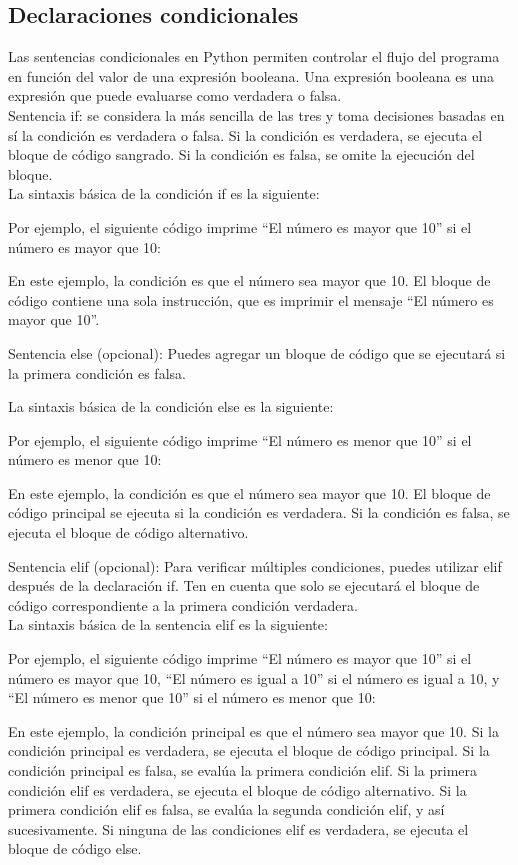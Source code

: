 \subsection{Declaraciones condicionales}
Las sentencias condicionales en Python permiten controlar el flujo del programa en función del valor de una expresión booleana. Una expresión booleana es una expresión que puede evaluarse como verdadera o falsa.\\

Sentencia if: se considera la más sencilla de las tres y toma decisiones basadas en sí la condición es verdadera o falsa. Si la condición es verdadera, se ejecuta el bloque de código sangrado. Si la condición es falsa, se omite la ejecución del bloque.\\

La sintaxis básica de la condición if es la siguiente:

Por ejemplo, el siguiente código imprime ``El número es mayor que 10'' si el número es mayor que 10:

En este ejemplo, la condición es que el número sea mayor que 10. El bloque de código contiene una sola instrucción, que es imprimir el mensaje ``El número es mayor que 10''.

Sentencia else (opcional): Puedes agregar un bloque de código que se ejecutará si la primera condición es falsa.

La sintaxis básica de la condición else es la siguiente:

Por ejemplo, el siguiente código imprime ``El número es menor que 10'' si el número es menor que 10:

En este ejemplo, la condición es que el número sea mayor que 10. El bloque de código principal se ejecuta si la condición es verdadera. Si la condición es falsa, se ejecuta el bloque de código alternativo.

Sentencia elif (opcional): Para verificar múltiples condiciones, puedes utilizar elif después de la declaración if. Ten en cuenta que solo se ejecutará el bloque de código correspondiente a la primera condición verdadera.\\

La sintaxis básica de la sentencia elif es la siguiente:


Por ejemplo, el siguiente código imprime ``El número es mayor que 10'' si el número es mayor que 10, ``El número es igual a 10'' si el número es igual a 10, y ``El número es menor que 10'' si el número es menor que 10:

En este ejemplo, la condición principal es que el número sea mayor que 10. Si la condición principal es verdadera, se ejecuta el bloque de código principal. Si la condición principal es falsa, se evalúa la primera condición elif. Si la primera condición elif es verdadera, se ejecuta el bloque de código alternativo. Si la primera condición elif es falsa, se evalúa la segunda condición elif, y así sucesivamente. Si ninguna de las condiciones elif es verdadera, se ejecuta el bloque de código else.

